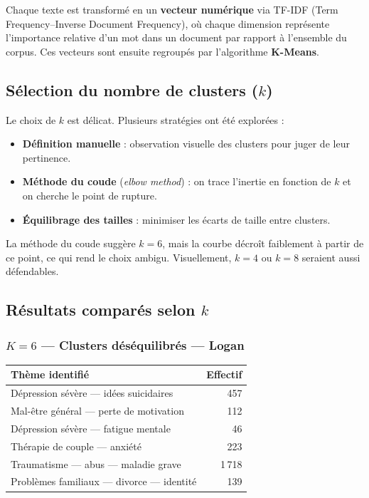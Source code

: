 \documentclass[12pt,a4paper]{article}
\begin{document}
Chaque texte est transformé en un \textbf{vecteur numérique} via TF-IDF (Term Frequency--Inverse Document Frequency), où chaque dimension représente l'importance relative d'un mot dans un document par rapport à l'ensemble du corpus. Ces vecteurs sont ensuite regroupés par l'algorithme \textbf{K-Means}.

\subsection{Sélection du nombre de clusters ($k$)}

Le choix de $k$ est délicat. Plusieurs stratégies ont été explorées :

\begin{itemize}
  \item \textbf{Définition manuelle} : observation visuelle des clusters pour juger de leur pertinence.
  \item \textbf{Méthode du coude} (\textit{elbow method}) : on trace l'inertie en fonction de $k$ et on cherche le point de rupture.
  \item \textbf{Équilibrage des tailles} : minimiser les écarts de taille entre clusters.
\end{itemize}

La méthode du coude suggère $k = 6$, mais la courbe décroît faiblement à partir de ce point, ce qui rend le choix ambigu. Visuellement, $k = 4$ ou $k = 8$ seraient aussi défendables.

\subsection{Résultats comparés selon $k$}

\subsubsection*{$K = 6$ --- Clusters déséquilibrés --- Logan}

\begin{center}
\begin{tabular}{lr}
\toprule
\textbf{Thème identifié} & \textbf{Effectif} \\
\midrule
Dépression sévère --- idées suicidaires & 457 \\
Mal-être général --- perte de motivation & 112 \\
Dépression sévère --- fatigue mentale & 46 \\
Thérapie de couple --- anxiété & 223 \\
Traumatisme --- abus --- maladie grave & 1\,718 \\
Problèmes familiaux --- divorce --- identité & 139 \\
\bottomrule
\end{tabular}
\end{center}
\end{document}
